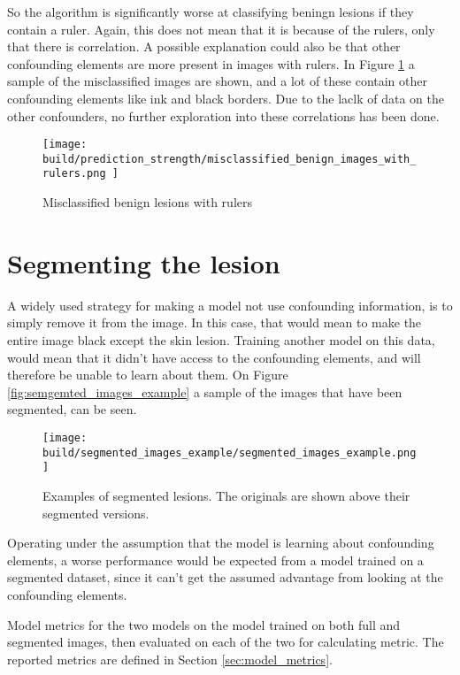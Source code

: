 So the algorithm is significantly worse at classifying beningn lesions if they contain a ruler.
Again, this does not mean that it is because of the rulers, only that there is correlation.
A possible explanation could also be that other confounding elements are more present in images with rulers.
In Figure \ref{fig:prediction_strength_ruler_misclassified_benign} a sample of the misclassified images are shown,
and a lot of these contain other confounding elements like ink and black borders.
Due to the laclk of data on the other confounders, no further exploration into these correlations has been done.

\begin{figure}
    \centering
    \texttt{[image: 
        build/prediction\_strength/misclassified\_benign\_images\_with\_rulers.png
    ]}
    \caption{Misclassified benign lesions with rulers}
    \label{fig:prediction_strength_ruler_misclassified_benign}
\end{figure}

\section{Segmenting the lesion}
A widely used strategy for making a model not use confounding information, is to simply remove it from the image.
In this case, that would mean to make the entire image black except the skin lesion.
Training another model on this data, would mean that it didn't have access to the confounding elements,
and will therefore be unable to learn about them.
On Figure \ref{fig:semgemted_images_example} a sample of the images that have been segmented,
can be seen.

\begin{figure}[h]
    \centering
    \texttt{[image: 
        build/segmented\_images\_example/segmented\_images\_example.png
    ]}
    \caption{Examples of segmented lesions. The originals are shown above their segmented versions.}
    \label{fig:segmented_images_example}
\end{figure}

Operating under the assumption that the model is learning about confounding elements,
a worse performance would be expected from a model trained on a segmented dataset,
since it can't get the assumed advantage from looking at the confounding elements.

\begin{table}
    
    \caption[Model metrics for model trained on both full and segmented images]{
        Model metrics for the two models on the model trained on both full and segmented images,
        then evaluated on each of the two for calculating metric.
        The reported metrics are defined in Section \ref{sec:model_metrics}.
    }
    \label{tab:segmented_metrics}
\end{table}


